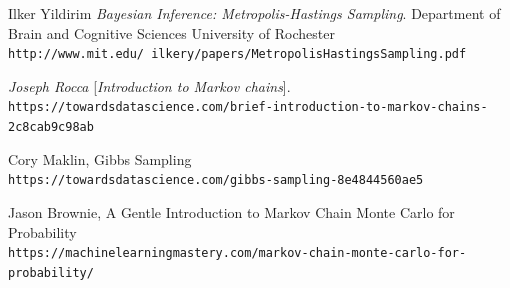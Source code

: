 \documentclass[11pt]{article}
\begin{document}
\begin{thebibliography}{9}
Ilker Yildirim
\textit{Bayesian Inference: Metropolis-Hastings Sampling}. 
Department of Brain and Cognitive Sciences University of Rochester \\
\texttt{http://www.mit.edu/~ilkery/papers/MetropolisHastingsSampling.pdf}

\textit{Joseph Rocca}
[\textit{Introduction to Markov chains}].\\ 
\texttt{https://towardsdatascience.com/brief-introduction-to-markov-chains-2c8cab9c98ab}

Cory Maklin,
Gibbs Sampling
\\\texttt{https://towardsdatascience.com/gibbs-sampling-8e4844560ae5}

Jason Brownie,
A Gentle Introduction to Markov Chain Monte Carlo for Probability
\\\texttt{https://machinelearningmastery.com/markov-chain-monte-carlo-for-probability/}

\end{thebibliography}

\end{document}
